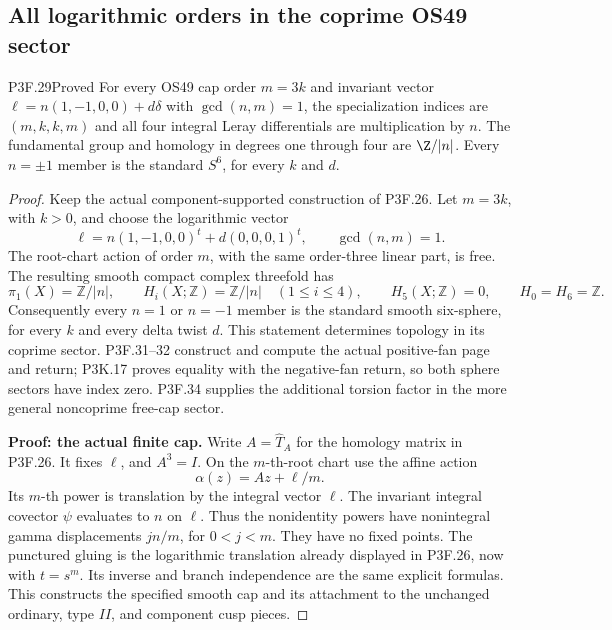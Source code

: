 \subsection{All logarithmic orders in the coprime OS49 sector}
\begin{statement}{P3F.29}{Proved}
For every OS49 cap order $m=3k$ and invariant vector $\ell=n(1,-1,0,0)+d\delta$ with $\gcd(n,m)=1$, the specialization indices are $(m,k,k,m)$ and all four integral Leray differentials are multiplication by $n$. The fundamental group and homology in degrees one through four are $\Z/|n|$. Every $n=\pm1$ member is the standard $S^6$, for every $k$ and $d$.
\end{statement}
\begin{proof}
Keep the actual component-supported construction of P3F.26. Let \(m=3k\), with \(k>0\), and choose the logarithmic vector \[
 \ell=n(1,-1,0,0)^t+d(0,0,0,1)^t,
 \qquad \gcd(n,m)=1.                                  \tag{P3F.29.1}
\] The root-chart action of order \(m\), with the same order-three linear part, is free. The resulting smooth compact complex threefold has \[
 \pi_1(X)=\mathbb Z/|n|,
 \qquad H_i(X;\mathbb Z)=\mathbb Z/|n|
       \quad(1\leq i\leq4),
 \qquad H_5(X;\mathbb Z)=0,
 \qquad H_0=H_6=\mathbb Z.                            \tag{P3F.29.2}
\] Consequently every \(n=1\) or \(n=-1\) member is the standard smooth six-sphere, for every \(k\) and every delta twist \(d\). This statement determines topology in its coprime sector. P3F.31--32 construct and compute the actual positive-fan page and return; P3K.17 proves equality with the negative-fan return, so both sphere sectors have index zero. P3F.34 supplies the additional torsion factor in the more general noncoprime free-cap sector.

\textbf{Proof: the actual finite cap.} Write \(A=\widehat T_A\) for the homology matrix in P3F.26. It fixes \(\ell\), and \(A^3=I\). On the \(m\)-th-root chart use the affine action \[
 \alpha(z)=Az+\ell/m.
\] Its \(m\)-th power is translation by the integral vector \(\ell\). The invariant integral covector \(\psi\) evaluates to \(n\) on \(\ell\). Thus the nonidentity powers have nonintegral gamma displacements \(jn/m\), for \(0<j<m\). They have no fixed points. The punctured gluing is the logarithmic translation already displayed in P3F.26, now with \(t=s^m\). Its inverse and branch independence are the same explicit formulas. This constructs the specified smooth cap and its attachment to the unchanged ordinary, type \(II\), and component cusp pieces.


\end{proof}

